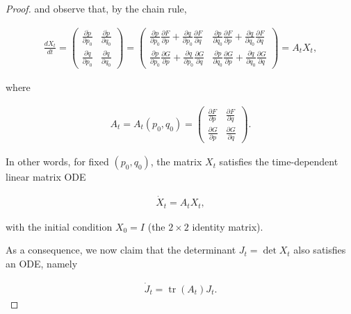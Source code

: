\documentclass[11pt]{report}
\theoremstyle{plain}
\theoremstyle{definition}
\begin{document}
\begin{proof}
\noindent and observe that, by the chain rule,

\begin{align*}
\frac{dX_t}{dt} =
\left(\begin{array}{cc}
\frac{\partial \dot{p}}{\partial p_0} & \frac{\partial \dot{p}}{\partial q_0} \\ \frac{\partial \dot{q}}{\partial p_0} & \frac{\partial \dot{q}}{\partial q_0}
\end{array}\right) =
\left(\begin{array}{cc}
\frac{\partial p}{\partial p_0} \frac{\partial F}{\partial p} + \frac{\partial q}{\partial p_0} \frac{\partial F}{\partial q} & \frac{\partial p}{\partial q_0} \frac{\partial F}{\partial p} + \frac{\partial q}{\partial q_0} \frac{\partial F}{\partial q} \\
\frac{\partial p}{\partial p_0} \frac{\partial G}{\partial p} + \frac{\partial q}{\partial p_0} \frac{\partial G}{\partial q} & \frac{\partial p}{\partial q_0} \frac{\partial G}{\partial p} + \frac{\partial q}{\partial q_0} \frac{\partial G}{\partial q}
\end{array}\right)
= A_t X_t,
\end{align*}

\noindent where

\begin{align*}
A_t = A_t(p_0,q_0) = \left(\begin{array}{cc} \frac{\partial F}{\partial p} & \frac{\partial F}{\partial q} \\ \frac{\partial G}{\partial p} & \frac{\partial G}{\partial q} \end{array}\right).
\end{align*}

\noindent In other words, for fixed $(p_0,q_0)$, the matrix
$X_t$ satisfies the time-dependent linear matrix ODE

\begin{align*}
\dot{X}_t = A_t X_t,
\end{align*}

\noindent with the initial condition $X_0 = I$ (the $2\times2$
identity matrix).

As a consequence, we now claim that the determinant
$J_t = \det X_t$ also satisfies an ODE, namely

\begin{equation*} \tag{18}\label{eq:liou-jac-ode}
\begin{split}
\dot{J}_t = \operatorname{tr}(A_t) J_t.
\end{split}
\end{equation*}


\end{proof}
\end{document}
